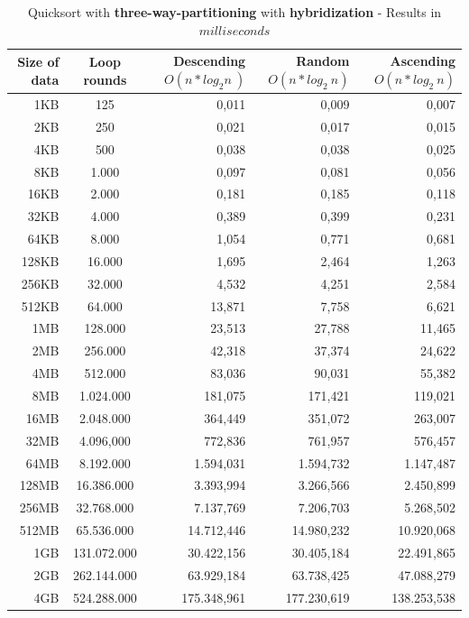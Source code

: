 \documentclass[11pt]{amsart}
\begin{document}
\clearpage
\begin{table}[htdp]
	\caption{Quicksort with \textbf{three-way-partitioning} with \textbf{hybridization} - Results in $milliseconds$}
	\begin{tabular}{|r|c|r|r|r|} \hline
		Size of data & Loop rounds & \parbox[c]{3.5cm}{Descending \\ $O(n*log_2n~)$} & \parbox[c]{3.5cm}{Random \\$O(n*log_2~n)$} & \parbox[c]{3.5cm}{Ascending \\ $O(n*log_2~n)$} \\ \hline
		1KB & 125 & 0,011 & 0,009 & 0,007 \\ \hline
		2KB & 250 & 0,021 & 0,017 & 0,015 \\ \hline
		4KB & 500 & 0,038 & 0,038 & 0,025 \\ \hline
		8KB & 1.000 & 0,097 & 0,081 & 0,056 \\ \hline
		16KB & 2.000 & 0,181 & 0,185 & 0,118 \\ \hline
		32KB & 4.000 & 0,389 & 0,399 & 0,231 \\ \hline
		64KB & 8.000 & 1,054 & 0,771 & 0,681 \\ \hline
		128KB & 16.000 & 1,695 & 2,464 & 1,263 \\ \hline
		256KB & 32.000 & 4,532 & 4,251 & 2,584 \\ \hline
		512KB & 64.000 & 13,871 & 7,758 & 6,621 \\ \hline
		1MB & 128.000 & 23,513 & 27,788 & 11,465 \\ \hline
		2MB & 256.000 & 42,318 & 37,374 & 24,622 \\ \hline
		4MB & 512.000 & 83,036 & 90,031 & 55,382 \\ \hline
		8MB & 1.024.000 & 181,075 & 171,421 & 119,021 \\ \hline
		16MB & 2.048.000 & 364,449 & 351,072 & 263,007 \\ \hline
		32MB & 4.096,000 & 772,836 & 761,957 & 576,457 \\ \hline
		64MB & 8.192.000 & 1.594,031 & 1.594,732 & 1.147,487 \\ \hline
		128MB & 16.386.000 & 3.393,994 & 3.266,566 & 2.450,899 \\ \hline
		256MB & 32.768.000 & 7.137,769 & 7.206,703 & 5.268,502 \\ \hline
		512MB & 65.536.000 & 14.712,446 & 14.980,232 & 10.920,068 \\ \hline
		1GB & 131.072.000 & 30.422,156 & 30.405,184 & 22.491,865 \\ \hline
		2GB & 262.144.000 & 63.929,184 & 63.738,425 & 47.088,279 \\ \hline
		4GB & 524.288.000 & 175.348,961 & 177.230,619 & 138.253,538 \\ \hline
	\end{tabular}
	\label{default}
\end{table}%
\clearpage
\end{document}

